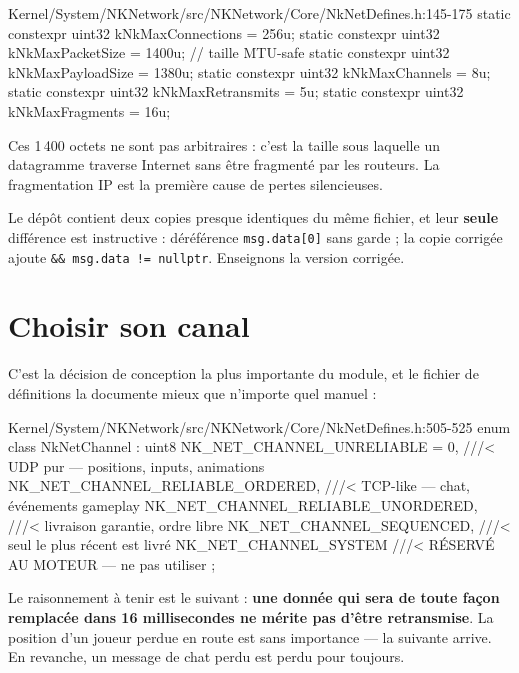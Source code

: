 \begin{nkcode}{Kernel/System/NKNetwork/src/NKNetwork/Core/NkNetDefines.h:145-175}
static constexpr uint32 kNkMaxConnections  = 256u;
static constexpr uint32 kNkMaxPacketSize   = 1400u;  // taille MTU-safe
static constexpr uint32 kNkMaxPayloadSize  = 1380u;
static constexpr uint32 kNkMaxChannels     = 8u;
static constexpr uint32 kNkMaxRetransmits  = 5u;
static constexpr uint32 kNkMaxFragments    = 16u;
\end{nkcode}

Ces 1\,400 octets ne sont pas arbitraires : c'est la taille sous laquelle un
datagramme traverse Internet sans être fragmenté par les routeurs. La
fragmentation IP est la première cause de pertes silencieuses.

\begin{nkpiege}
Le dépôt contient deux copies presque identiques du même fichier, et leur
\textbf{seule} différence est instructive :
 déréférence
\texttt{msg.data[0]} sans garde ; la copie corrigée ajoute
\texttt{\&\& msg.data != nullptr}. Enseignons la version corrigée.
\end{nkpiege}

\section{Choisir son canal}

C'est la décision de conception la plus importante du module, et le fichier de
définitions la documente mieux que n'importe quel manuel :

\begin{nkcode}{Kernel/System/NKNetwork/src/NKNetwork/Core/NkNetDefines.h:505-525}
enum class NkNetChannel : uint8 {
    NK_NET_CHANNEL_UNRELIABLE = 0,       ///< UDP pur — positions, inputs, animations
    NK_NET_CHANNEL_RELIABLE_ORDERED,     ///< TCP-like — chat, événements gameplay
    NK_NET_CHANNEL_RELIABLE_UNORDERED,   ///< livraison garantie, ordre libre
    NK_NET_CHANNEL_SEQUENCED,            ///< seul le plus récent est livré
    NK_NET_CHANNEL_SYSTEM                ///< RÉSERVÉ AU MOTEUR — ne pas utiliser
};
\end{nkcode}

Le raisonnement à tenir est le suivant : \textbf{une donnée qui sera de toute
façon remplacée dans 16 millisecondes ne mérite pas d'être retransmise}. La
position d'un joueur perdue en route est sans importance — la suivante arrive.
En revanche, un message de chat perdu est perdu pour toujours.

